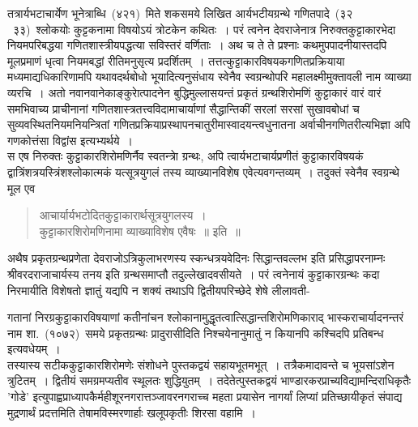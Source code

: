\documentclass[11pt, openany]{book}
\begin{document}
\indent तत्रार्यभटाचार्येण भूनेत्राब्धि~(४२१)~मिते शकसमये लिखित आर्यभटीयग्रन्थे गणितपादे~(३२ \textendash\ ३३)~श्लोकयोः कुट्टकनामा विषयोऽयं त्रोटकेन कथितः~। परं त्वनेन देवराजेनात्र निरुक्तकुट्टाकारभेदा नियमपरिबद्धया गणितशास्त्रीयपद्धत्या सविस्तरं वर्णिताः~। अथ च ते ते प्रश्नाः कथमुपपादनीयास्तदपि मूलप्रमाणं धृत्वा नियमबद्धां रीतिमनुसृत्य प्रदर्शितम्~। तत्तत्कुट्टाकारविषयकगणितप्रक्रियाया मध्यमाद्यधिकारिणामपि यथावदर्थबोधो भूयादित्यनुसंधाय स्वेनैव स्वग्रन्थोपरि महालक्ष्मीमुक्तावली नाम व्याख्या व्यरचि~। अतो नवानवानेकाङ्कुराेत्पादनेन बुद्धिमुल्लासयन्तं प्रकृतं ग्रन्थशिरोमणिं कुट्टाकारं वारं वारं समभिवाच्य प्राचीनानां गणितशास्त्रतत्त्वविदामाचार्याणां सैद्धान्तिकीं सरलां सरसां सुखावबोधां च सुव्यवस्थितनियमनियन्त्रितां गणितप्रक्रियाप्रस्थापनचातुरीमास्वादयन्त्वधुनातना अर्वाचीनगणितरीत्यभिज्ञा अपि गणकोत्तंसा विद्वांस इत्यभ्यर्थये~।\\

\indent
स एष निरुक्तः कुट्टाकारशिरोमणिर्नैव स्वतन्त्राे ग्रन्थः, अपि त्वार्यभटाचार्यप्रणीतं कुट्टाकारविषयकं द्वात्रिंशत्रयस्त्रिंशश्लोकात्मकं यत्सूत्रयुगलं तस्य व्याख्यानविशेष एवेत्यवगन्तव्यम्~। तदुक्तं स्वेनैव स्वग्रन्थे मूल एव\textendash

\begin{quote}
{\qt आचार्यार्यभटोदितकुट्टाकारार्थसूत्रयुगलस्य~।\\
कुट्टाकारशिरोमणिनामा व्याख्याविशेष एवैषः~॥} इति~॥\\
\end{quote}
\indent अथैष प्रकृतग्रन्थप्रणेता देवराजोऽत्रिकुलाभरणस्य स्कन्धत्रयवेदिनः सिद्धान्तवल्लभ इति प्रसिद्धापरनाम्नः श्रीवरदराजाचार्यस्य तनय इति ग्रन्थसमाप्तौ तदुल्लेखादवसीयते~। परं त्वनेनायं कुट्टाकारग्रन्थः कदा निरमायीति विशेषतो ज्ञातुं यद्यपि न शक्यं तथाऽपि द्वितीयपरिच्छेदे शेषे लीलावती-

\newpage
\thispagestyle{fancy}
\fancyhf{}
\chead{\textbf{[३]}}

\noindent
गतानां निरग्रकुट्टाकारविषयाणां कतीनांचन श्लोकानामुद्धृतत्वात्सिद्धान्तशिरोमणिकाराद् भास्कराचार्यादनन्तरं नाम शा.~(१०७२)~समये प्रकृतग्रन्थः प्रादुरासीदिति निश्चयेनानुमातुं न कियानपि कश्चिदपि प्रतिबन्ध इत्यवधेयम्~।\\

\indent
तस्यास्य सटीककुट्टाकारशिरोमणेः संशोधने पुस्तकद्वयं सहायभूतमभूत्~। तत्रैकमादावन्ते च भूयसांऽशेन त्रुटितम्~। द्वितीयं समग्रमप्यतीव स्थूलतः शुद्धियुतम्~। तदेतेत्पुस्तकद्वयं भाण्डारकरप्राच्यविद्यामन्दिराधिकृतैः 'गोडे' इत्युपाह्वप्राध्यापकैर्महीशूरनगरात्तञ्जावरनगराच्च महता प्रयासेन नागर्यां लिप्यां प्रतिच्छायीकृतं संपाद्य मुद्रणार्थं प्रदत्तमिति तेषामविस्मरणार्हाः
खलूपकृतीः शिरसा वहामि~।\\
\end{document}
